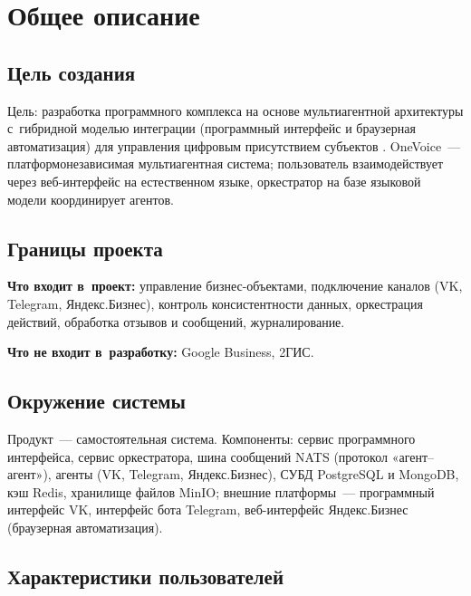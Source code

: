 
\chapter{Общее описание}
\label{ch:general}

\section{Цель создания}
\label{sec:goal}

Цель: разработка программного комплекса на основе мультиагентной архитектуры с~гибридной моделью интеграции (программный интерфейс и браузерная автоматизация) для управления цифровым присутствием субъектов . OneVoice~--- платформонезависимая мультиагентная система; пользователь взаимодействует через веб-интерфейс на естественном языке, оркестратор на базе языковой модели координирует агентов.

\section{Границы проекта}
\label{sec:scope}

\textbf{Что входит в~проект:} управление бизнес-объектами, подключение каналов (VK, Telegram, Яндекс.Бизнес), контроль консистентности данных, оркестрация действий, обработка отзывов и сообщений, журналирование.

\textbf{Что не входит в~разработку:} Google Business, 2ГИС.

\section{Окружение системы}
\label{sec:environment}

Продукт~--- самостоятельная система. Компоненты: сервис программного интерфейса, сервис оркестратора, шина сообщений NATS (протокол «агент--агент»), агенты (VK, Telegram, Яндекс.Бизнес), СУБД PostgreSQL и MongoDB, кэш Redis, хранилище файлов MinIO; внешние платформы~--- программный интерфейс VK, интерфейс бота Telegram, веб-интерфейс Яндекс.Бизнес (браузерная автоматизация).

\section{Характеристики пользователей}
\label{sec:users}

